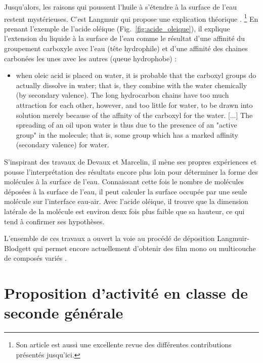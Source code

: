 \documentclass[12pt,a4paper]{article}
\begin{document}
Jusqu'alors, les raisons qui poussent l'huile à s'étendre à la surface de l'eau restent mystérieuses.
C'est Langmuir qui propose une explication théorique \cite{Langmuir1917}.
\footnote{Son article est aussi une excellente revue des différentes contributions présentés jusqu'ici.}
En prenant l'exemple de l'acide oléique (Fig.~\ref{fig:acide_oleique}), il explique l'extension du liquide à la surface de l'eau comme le résultat d'une affinité du groupement carboxyle avec l'eau (tête hydrophile) et d'une affinité des chaines carbonées les unes avec les autres (queue hydrophobe) :
\begin{itemize}
\item[]
\og [...] when oleic acid is placed on water, it is probable that the carboxyl groups do actually dissolve in water; that is, they combine with the water chemically (by secondary valence). The long hydrocarbon chains have too much attraction for each other, however, and too little for water, to be drawn into solution merely because of the affnity of the carboxyl for the water.
[...]
The spreading of an oil upon water is thus due to the presence of an "active group" in the molecule; that is, some group which has a marked affinity (secondary valence) for water.
\fg{} 
\end{itemize}

S'inspirant des travaux de Devaux et Marcelin, il mène ses propres expériences et pousse l'interprétation des résultats encore plus loin pour déterminer la forme des molécules à la surface de l'eau.
Connaissant cette fois le nombre de molécules déposées à la surface de l'eau, il peut calculer la surface occupée par une seule molécule sur l'interface eau-air.
Avec l'acide oléique, il trouve que la dimension latérale de la molécule est environ deux fois plus faible que sa hauteur, ce qui tend à confirmer ses hypothèses.

L'ensemble de ces travaux a ouvert la voie au procédé de déposition Langmuir-Blodgett  qui permet encore actuellement d'obtenir des film mono ou multicouche de composés variés \cite{BiolinScientific2011}.

\section{Proposition d'activité en classe de seconde générale}
\end{document}
